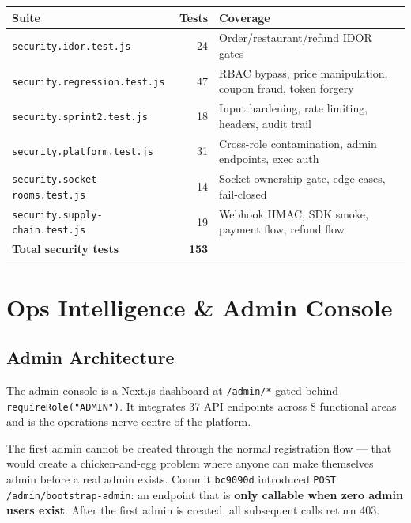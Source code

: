 \documentclass[11pt,a4paper,twoside]{book}
\newcommand{\th}[1]{\textbf{\color{white}#1}}
\begin{document}
\begin{center}\small
\begin{tabular}{lrp{7cm}}
\toprule
\rowcolor{headbg}\th{Suite} & \th{Tests} & \th{Coverage} \\
\midrule
\texttt{security.idor.test.js}        & 24 & Order/restaurant/refund IDOR gates \\
\rowcolor{rowalt}\texttt{security.regression.test.js}  & 47 & RBAC bypass, price manipulation, coupon fraud, token forgery \\
\texttt{security.sprint2.test.js}     & 18 & Input hardening, rate limiting, headers, audit trail \\
\rowcolor{rowalt}\texttt{security.platform.test.js}    & 31 & Cross-role contamination, admin endpoints, exec auth \\
\texttt{security.socket-rooms.test.js}& 14 & Socket ownership gate, edge cases, fail-closed \\
\rowcolor{rowalt}\texttt{security.supply-chain.test.js}& 19 & Webhook HMAC, SDK smoke, payment flow, refund flow \\
\midrule
\textbf{Total security tests}         & \textbf{153} & \\
\bottomrule
\end{tabular}
\end{center}

\chapter{Ops Intelligence \& Admin Console}

\section{Admin Architecture}

The admin console is a Next.js dashboard at \texttt{/admin/*} gated behind
\texttt{requireRole("ADMIN")}.  It integrates 37 API endpoints across 8
functional areas and is the operations nerve centre of the platform.

\begin{tcolorbox}[insight,title=Bootstrap Admin]
The first admin cannot be created through the normal registration flow — that
would create a chicken-and-egg problem where anyone can make themselves admin
before a real admin exists.  Commit \texttt{bc9090d} introduced \texttt{POST /admin/bootstrap-admin}:
an endpoint that is \textbf{only callable when zero admin users exist}.  After
the first admin is created, all subsequent calls return 403.
\end{tcolorbox}
\end{document}
